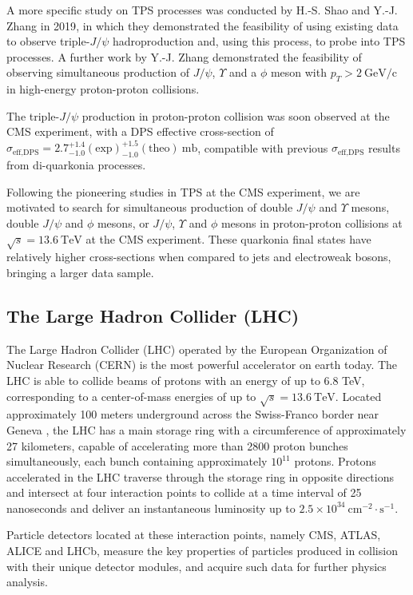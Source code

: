 \documentclass[10pt,twocolumn]{article}
\newcommand*{\effXsecDPS}{\sigma_{\text{eff,DPS}}}
\newcommand*{\GeVc}{~\text{GeV/c}}
\begin{document}
A more specific study on TPS processes was conducted by H.-S. Shao and Y.-J. Zhang in 2019\cite{YJZ_TRI_JPSI}, in which they demonstrated the feasibility of using existing data to observe triple-$J/\psi$ hadroproduction and, using this process, to probe into TPS processes. A further work by Y.-J. Zhang demonstrated the feasibility of observing simultaneous production of $J/\psi$, $\Upsilon$ and a $\phi$ meson with $p_T > 2\GeVc$ in high-energy proton-proton collisions\cite{YJZ_MPS_REPORT}.

The triple-$J/\psi$ production in proton-proton collision was soon observed at the CMS experiment, with a DPS effective cross-section of $\effXsecDPS = 2.7^{+1.4}_{-1.0}(\text{exp})^{+1.5}_{-1.0}(\text{theo}) ~\text{mb}$, compatible with previous $\effXsecDPS$ results from di-quarkonia processes. 

Following the pioneering studies in TPS at the CMS experiment, we are motivated to search for simultaneous production of double $J/\psi$ and $\Upsilon$ mesons, double $J/\psi$ and $\phi$ mesons, or $J/\psi$, $\Upsilon$ and $\phi$ mesons in proton-proton collisions at $\sqrt{s} = 13.6 ~ \mathrm{TeV}$ at the CMS experiment. These quarkonia final states have relatively higher cross-sections when compared to jets and electroweak bosons, bringing a larger data sample.

\subsection{The Large Hadron Collider (LHC)}

The Large Hadron Collider (LHC) operated by the European Organization of Nuclear Research (CERN) is the most powerful accelerator on earth today. The LHC is able to collide beams of protons with an energy of up to 6.8 TeV, corresponding to a center-of-mass energies of up to $\sqrt{s}=13.6~\mathrm{TeV}$. Located approximately 100 meters underground across the Swiss-Franco border near Geneva , the LHC has a main storage ring with a circumference of approximately 27 kilometers, capable of accelerating more than 2800 proton bunches simultaneously, each bunch containing approximately $10^11$ protons. Protons accelerated in the LHC traverse through the storage ring in opposite directions and intersect at four interaction points to collide at a time interval of 25 nanoseconds and deliver an instantaneous luminosity up to $2.5\times 10^{34} ~\text{cm}^{-2}\cdot\text{s}^{-1}$\cite{CMS:LUMI-PUB}. 

Particle detectors located at these interaction points, namely CMS, ATLAS, ALICE and LHCb, measure the key properties of particles produced in collision with their unique detector modules, and acquire such data for further physics analysis.
\end{document}

